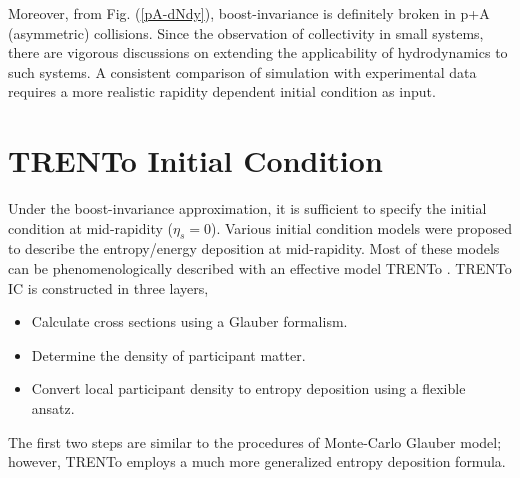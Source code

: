 \documentclass[aps,prl,twocolumn,groupedaddress]{revtex4-1}
\begin{document}
	Moreover, from Fig. (\ref{pA-dNdy}), boost-invariance is definitely broken in p+A (asymmetric) collisions.
	Since the observation of collectivity in small systems, there are vigorous discussions on extending the applicability of hydrodynamics to such systems.
	A consistent comparison of simulation with experimental data requires a more realistic rapidity dependent initial condition as input.
	
	
	
	\section{TRENTo Initial Condition}
	Under the boost-invariance approximation, it is sufficient to specify the initial condition at mid-rapidity ($\eta_s = 0$). Various initial condition models were proposed to describe the entropy/energy deposition at mid-rapidity. 
	Most of these models can be phenomenologically described with an effective model TRENTo \cite{Moreland:2014oya}. 
	TRENTo IC is constructed in three layers,
	\begin{itemize}
		\item Calculate cross sections using a Glauber formalism.
		\item Determine the density of participant matter. 
		\item Convert local participant density to entropy deposition using a flexible ansatz.
	\end{itemize}
	The first two steps are similar to the procedures of Monte-Carlo Glauber model; however, TRENTo employs a much more generalized entropy deposition formula.
\end{document}
